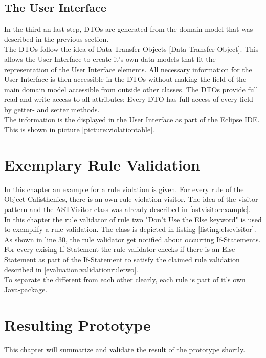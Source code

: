 \subsection{The User Interface}
In the third an last step, \acf{DTO}s are generated from the domain model that was described in the previous section. 
\\

The \acf{DTO}s follow the idea of Data Transfer Objects \cite{wiki}[Data Transfer Object]. This allows the User Interface to create it's own data models that fit the representation of the User Interface elements. All necessary information for the User Interface is then accessible in the \acf{DTO}s without making the field of the main domain model accessible from outside other classes. The \acf{DTO}s provide full read and write access to all attributes: Every \acf{DTO} has full access of every field by getter- and setter methods. 
\\

The information is the displayed in the User Interface as part of the Eclipse \acf{IDE}. This is shown in picture \ref{picture:violationtable}.

\section{Exemplary Rule Validation}
\label{p:example}
In this chapter an example for a rule violation is given. For every rule of the Object Calisthenics, there is an own rule violation visitor. The idea of the visitor pattern and the \acf{ASTVisitor} class was already described in \ref{astvisitorexample}. 
\\

In this chapter the rule validator of rule two "Don't Use the Else keyword" is used to exemplify a rule validation. The class is depicted in listing \ref{listing:elsevisitor}.
\\

As shown in line 30, the rule validator get notified about occurring If-Statements. For every exising If-Statement the rule validator checks if there is an Else-Statement as part of the If-Statement to satisfy the claimed rule validation described in \ref{evaluation:validationruletwo}. 
\\

To separate the different from each other clearly, each rule is part of it's own Java-package. 

\section{Resulting Prototype}
\label{p:result}
This chapter will summarize and validate the result of the prototype shortly. 
\\

